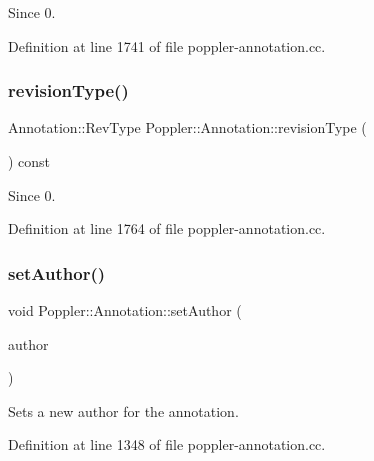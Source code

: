 \begin{DoxySince}{Since}
0. 
\end{DoxySince}


Definition at line 1741 of file poppler-\/annotation.\+cc.

\mbox{\label{class_poppler_1_1_annotation_a1aafb6d259755a1ed36498c70c9837ef}} 
\subsubsection{\texorpdfstring{revision\+Type()}{revisionType()}}
{\footnotesize\ttfamily Annotation\+::\+Rev\+Type Poppler\+::\+Annotation\+::revision\+Type (\begin{DoxyParamCaption}{ }\end{DoxyParamCaption}) const}

\begin{DoxySince}{Since}
0. 
\end{DoxySince}


Definition at line 1764 of file poppler-\/annotation.\+cc.

\mbox{\label{class_poppler_1_1_annotation_a519a5f64785bf1381921f6f62dded881}} 
\subsubsection{\texorpdfstring{set\+Author()}{setAuthor()}}
{\footnotesize\ttfamily void Poppler\+::\+Annotation\+::set\+Author (\begin{DoxyParamCaption}\item[{const Q\+String \&}]{author }\end{DoxyParamCaption})}

Sets a new author for the annotation. 

Definition at line 1348 of file poppler-\/annotation.\+cc.

\mbox{\label{class_poppler_1_1_annotation_ad7632d611ff26ec76cc42d301d2296e9}} 
